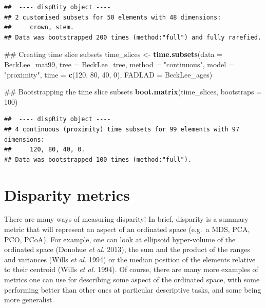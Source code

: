 \documentclass[]{book}
\newenvironment{Shaded}{\begin{snugshade}}{\end{snugshade}}
\newcommand{\KeywordTok}[1]{\textcolor[rgb]{0.13,0.29,0.53}{\textbf{#1}}}
\newcommand{\DataTypeTok}[1]{\textcolor[rgb]{0.13,0.29,0.53}{#1}}
\newcommand{\DecValTok}[1]{\textcolor[rgb]{0.00,0.00,0.81}{#1}}
\newcommand{\StringTok}[1]{\textcolor[rgb]{0.31,0.60,0.02}{#1}}
\newcommand{\NormalTok}[1]{#1}
\theoremstyle{definition}
\theoremstyle{definition}
\theoremstyle{remark}
\begin{document}
\begin{verbatim}
##  ---- dispRity object ---- 
## 2 customised subsets for 50 elements with 48 dimensions:
##     crown, stem.
## Data was bootstrapped 200 times (method:"full") and fully rarefied.
\end{verbatim}

\begin{Shaded}
\begin{Highlighting}[]
\NormalTok{## Creating time slice subsets}
\NormalTok{time_slices <-}\StringTok{ }\KeywordTok{time.subsets}\NormalTok{(}\DataTypeTok{data =}\NormalTok{ BeckLee_mat99, }\DataTypeTok{tree =}\NormalTok{ BeckLee_tree, }
                               \DataTypeTok{method =} \StringTok{"continuous"}\NormalTok{, }\DataTypeTok{model =} \StringTok{"proximity"}\NormalTok{, }
                               \DataTypeTok{time =} \KeywordTok{c}\NormalTok{(}\DecValTok{120}\NormalTok{, }\DecValTok{80}\NormalTok{, }\DecValTok{40}\NormalTok{, }\DecValTok{0}\NormalTok{),}
                               \DataTypeTok{FADLAD =}\NormalTok{ BeckLee_ages)}

\NormalTok{## Bootstrapping the time slice subsets}
\KeywordTok{boot.matrix}\NormalTok{(time_slices, }\DataTypeTok{bootstraps =} \DecValTok{100}\NormalTok{)}
\end{Highlighting}
\end{Shaded}

\begin{verbatim}
##  ---- dispRity object ---- 
## 4 continuous (proximity) time subsets for 99 elements with 97 dimensions:
##     120, 80, 40, 0.
## Data was bootstrapped 100 times (method:"full").
\end{verbatim}

\hypertarget{disparity-metrics}{\section{Disparity
metrics}\label{disparity-metrics}}

There are many ways of measuring disparity! In brief, disparity is a
summary metric that will represent an aspect of an ordinated space
(e.g.~a MDS, PCA, PCO, PCoA). For example, one can look at ellipsoid
hyper-volume of the ordinated space (Donohue \emph{et al.} 2013), the
sum and the product of the ranges and variances (Wills \emph{et al.}
1994) or the median position of the elements relative to their centroid
(Wills \emph{et al.} 1994). Of course, there are many more examples of
metrics one can use for describing some aspect of the ordinated space,
with some performing better than other ones at particular descriptive
tasks, and some being more generalist.
\end{document}
